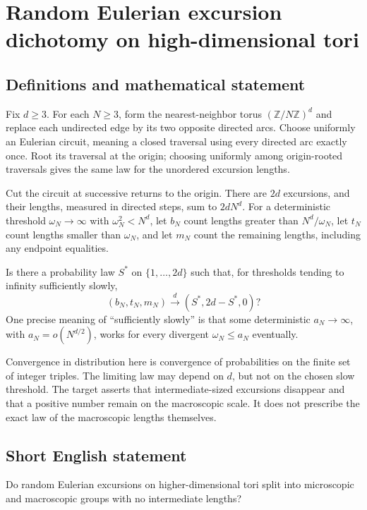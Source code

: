 \documentclass[11pt,a4paper]{article}
\begin{document}
\section*{Random Eulerian excursion dichotomy on high-dimensional tori}\label{statement}

\subsection{Definitions and mathematical statement}
Fix $d\ge3$. For each $N\ge3$, form the nearest-neighbor torus $(\mathbb Z/N\mathbb Z)^d$ and replace each undirected edge by its two opposite directed arcs. Choose uniformly an Eulerian circuit, meaning a closed traversal using every directed arc exactly once. Root its traversal at the origin; choosing uniformly among origin-rooted traversals gives the same law for the unordered excursion lengths.

Cut the circuit at successive returns to the origin. There are $2d$ excursions, and their lengths, measured in directed steps, sum to $2dN^d$. For a deterministic threshold $\omega_N\to\infty$ with $\omega_N^2<N^d$, let $b_N$ count lengths greater than $N^d/\omega_N$, let $t_N$ count lengths smaller than $\omega_N$, and let $m_N$ count the remaining lengths, including any endpoint equalities.

Is there a probability law $S^*$ on $\{1,\ldots,2d\}$ such that, for thresholds tending to infinity sufficiently slowly,
\[
(b_N,t_N,m_N)\xrightarrow{d}(S^*,2d-S^*,0)?
\]
One precise meaning of ``sufficiently slowly'' is that some deterministic $a_N\to\infty$, with $a_N=o(N^{d/2})$, works for every divergent $\omega_N\le a_N$ eventually.

Convergence in distribution here is convergence of probabilities on the finite set of integer triples. The limiting law may depend on $d$, but not on the chosen slow threshold. The target asserts that intermediate-sized excursions disappear and that a positive number remain on the macroscopic scale. It does not prescribe the exact law of the macroscopic lengths themselves.
\subsection{Short English statement}
Do random Eulerian excursions on higher-dimensional tori split into microscopic and macroscopic groups with no intermediate lengths?
\end{document}
